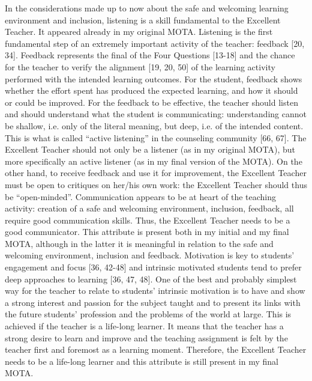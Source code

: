 \documentclass[
  a4paper, 
]{fortysecondscv}
\begin{document}
In the considerations made up to now about the safe and welcoming learning environment and inclusion, listening is a skill fundamental to the Excellent Teacher. It appeared already in my original MOTA. Listening is the first fundamental step of an extremely important activity of the teacher: feedback [20, 34]. Feedback represents the final of the Four Questions [13-18] and the chance for the teacher to verify the alignment [19, 20, 50] of the learning activity performed with the intended learning outcomes. For the student, feedback shows whether the effort spent has produced the expected learning, and how it should or could be improved. For the feedback to be effective, the teacher should listen and should understand what the student is communicating: understanding cannot be shallow, i.e. only of the literal meaning, but deep, i.e. of the intended content. This is what is called “active listening” in the counseling community [66, 67]. The Excellent Teacher should not only be a listener (as in my original MOTA), but more specifically an active listener (as in my final version of the MOTA). On the other hand, to receive feedback and use it for improvement, the Excellent Teacher must be open to critiques on her/his own work: the Excellent Teacher should thus be “open-minded”. Communication appears to be at heart of the teaching activity: creation of a safe and welcoming environment, inclusion, feedback, all require good communication skills. Thus, the Excellent Teacher needs to be a good communicator. This attribute is present both in my initial and my final MOTA, although in the latter it is meaningful in relation to the safe and welcoming environment, inclusion and feedback.
Motivation is key to students’ engagement and focus [36, 42-48] and intrinsic motivated students tend to prefer deep approaches to learning [36, 47, 48]. One of the best and probably simplest way for the teacher to relate to students’ intrinsic motivation is to have and show a strong interest and passion for the subject taught and to present its links with the future students’ profession and the problems of the world at large. This is achieved if the teacher is a life-long learner. It means that the teacher has a strong desire to learn and improve and the teaching assignment is felt by the teacher first and foremost as a learning moment. Therefore, the Excellent Teacher needs to be a life-long learner and this attribute is still present in my final MOTA.
\end{document}
